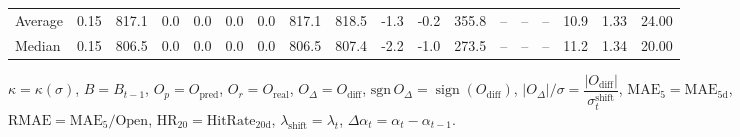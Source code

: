 \begin{threeparttable}
{\begin{tabular}{lrrrrrrrrrrrrrrrrr}
Average &     0.15 & 817.1 &               0.0 &               0.0 &                0.0 &                0.0 & 817.1 & 818.5 &       -1.3 &                     -0.2 &               355.8 &         -- &        -- &             -- &             10.9 &            1.33 &                  24.00 \\
 Median &     0.15 & 806.5 &               0.0 &               0.0 &                0.0 &                0.0 & 806.5 & 807.4 &       -2.2 &                     -1.0 &               273.5 &         -- &        -- &             -- &             11.2 &            1.34 &                  20.00 \\
\bottomrule
\end{tabular}
}
\begin{tablenotes}\footnotesize
\item $\kappa=\kappa(\sigma)$, $B=B_{t-1}$, $O_p=O_{\text{pred}}$, $O_r=O_{\text{real}}$, $O_\Delta=O_{\text{diff}}$, $\mathrm{sgn}\,O_\Delta=\operatorname{sign}(O_{\text{diff}})$, $|O_\Delta|/\sigma=\dfrac{|O_{\text{diff}}|}{\sigma_t^{\text{shift}}}$, $\mathrm{MAE}_5=\mathrm{MAE}_{5\text{d}}$, $\mathrm{RMAE}= \mathrm{MAE}_5 / \text{Open}$, $\mathrm{HR}_{20}=\mathrm{HitRate}_{20\text{d}}$, 
$\lambda_{\text{shift}}=\lambda_t$, 
$\Delta\alpha_t=\alpha_t-\alpha_{t-1}$.
\end{tablenotes}
\end{threeparttable}
\endgroup

